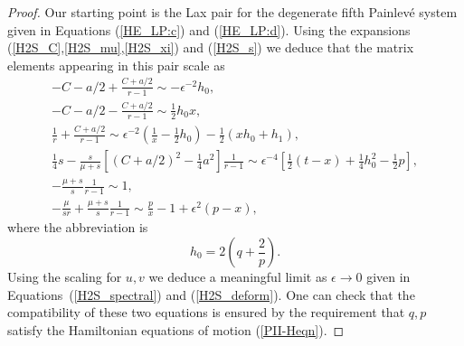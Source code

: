 \documentclass[10pt,reqno]{amsart}
\theoremstyle{plain}
\theoremstyle{definition}
\theoremstyle{remark}
\begin{document}
\begin{proof}
Our starting point is the Lax pair for the degenerate fifth Painlev\'e system given in Equations (\ref{HE_LP:c}) 
and (\ref{HE_LP:d}). Using the expansions (\ref{H2S_C},\ref{H2S_mu},\ref{H2S_xi}) and (\ref{H2S_s})  we deduce 
that the matrix elements appearing in this pair scale as
\begin{gather}
  -C-a/2+\frac{C+a/2}{r-1} \sim -\epsilon^{-2}h_0 ,
\\
  -C-a/2-\frac{C+a/2}{r-1} \sim \tfrac{1}{2}h_0 x,
\\
  \frac{1}{r}+\frac{C+a/2}{r-1} \sim \epsilon^{-2}\left( \frac{1}{x}-{\tfrac{1}{2}} h_0 \right) - {\tfrac{1}{2}}\left( xh_0+h_1 \right) ,
\\
  {\tfrac{1}{4}} s-\frac{s}{\mu+s}\left[ (C+a/2)^2-{\tfrac{1}{4}} a^2 \right]\frac{1}{r-1} \sim \epsilon^{-4}\left[ {\tfrac{1}{2}}(t-x)+ \tfrac{1}{4}h_0^2-\tfrac{1}{2}p \right] ,
\\
   -\frac{\mu+s}{s}\frac{1}{r-1} \sim 1 ,
\\
  -\frac{\mu}{sr}+\frac{\mu+s}{s}\frac{1}{r-1} \sim \frac{p}{x}-1 + \epsilon^2(p-x) ,
\end{gather} 
where the abbreviation is
\begin{equation}
    h_0 = 2\left( q+\frac{2}{p} \right) .
\end{equation}
Using the scaling for $ u,v $ we deduce a meaningful limit as $ \epsilon\to 0 $ given in Equations~(\ref{H2S_spectral}) 
and (\ref{H2S_deform}). One can check that the compatibility of these two equations is ensured by the requirement 
that $ q,p $ satisfy the Hamiltonian equations of motion (\ref{PII-Heqn}).
\end{proof}
\end{document}

